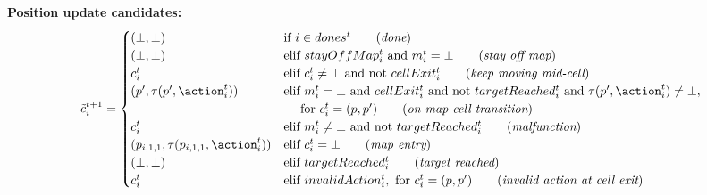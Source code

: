 \textbf{Position update candidates:}
\begin{equation}
\tilde{c}_i^{t+1}=
        \begin{cases}
            (\bot,\bot) & \text{if } i \in dones^t \qquad (\textit{done}) \\
            (\bot,\bot) & \text{elif } stayOffMap_i^t \text{ and } m_i^{t} = \bot \qquad (\textit{stay off map}) \\
            c_i^{t} & \text{elif } c_i^t \not= \bot \text{ and not } cellExit_i^t \qquad (\textit{keep moving mid-cell}) \\
            (p',\tau(p',\action_i^t)) & \text{elif } m_i^{t} = \bot \text{ and } cellExit_i^t \text{ and not } targetReached_i^t \text{ and } \tau(p',\action_i^t) \not= \bot, \\
                                      & \quad \text{ for } c_i^t=(p,p') \qquad (\textit{on-map cell transition}) \\
            c_i^{t} & \text{elif } m_i^{t} \not= \bot \text{ and not } targetReached_i^t \qquad (\textit{malfunction}) \\
            (p_{i,1,1}, \tau(p_{i,1,1}, \action_i^t)) & \text{elif } c_i^t = \bot \qquad (\textit{map entry}) \\
            (\bot,\bot) & \text{elif } targetReached_i^t \qquad (\textit{target reached}) \\
            c_i^{t} & \text{elif } invalidAction_i^t, \text{ for } c_i^t=(p,p') \qquad (\textit{invalid action at cell exit}) \\
        \end{cases}
\end{equation}

